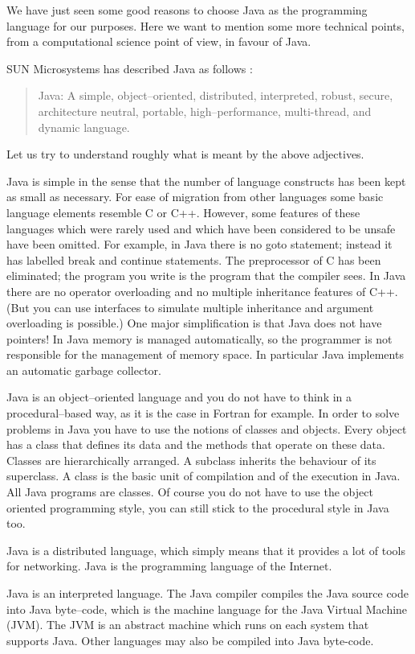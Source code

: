 We have just seen some good reasons to choose Java as the programming language
for our purposes. Here we want to mention some more technical points, from a 
computational science point of view, in favour of Java.

SUN Microsystems has described Java as follows \cite[]{javanutshell}:
\begin{quote}
Java: A simple, object--oriented, distributed, interpreted, robust, secure,
architecture neutral, portable, high--performance, multi-thread, and dynamic 
language.
\end{quote}
Let us try to understand roughly what is meant by the above adjectives.

Java is simple in the sense that the number of language constructs has been 
kept as small as necessary. For ease of migration from other languages some
basic language elements resemble C or C++. However, some features of these 
languages which were rarely used and which have been considered to be unsafe 
have been omitted. For example, in Java there is no goto statement; instead 
it has labelled break and continue statements. The preprocessor of C has been 
eliminated; the program you write is the program that the compiler sees. In 
Java there are no  operator overloading and no multiple inheritance 
features of C++. (But you can use interfaces to simulate multiple inheritance
and argument overloading is possible.)
One major simplification is that Java does not have pointers!
In Java memory is managed automatically, so the programmer is not responsible 
for the management  of memory space. In particular Java implements an 
automatic  garbage collector.

Java is an object--oriented language and you do not have to think in a 
procedural--based way, as it is the case in Fortran for example. In order to 
solve problems in Java you have to use the notions of classes and objects. 
Every object has a class that defines its data and the methods that operate 
on these data. Classes are hierarchically arranged. A subclass inherits the 
behaviour of its superclass. A class is the basic unit of compilation
and of the execution in Java. All Java programs are classes.
Of course you do not have to use the object oriented programming style,
you can still stick to the procedural style in Java too.

Java is a distributed language, which simply means that it provides a lot of 
tools for networking. Java is the programming language of the Internet.

Java is an interpreted language. The Java compiler compiles the Java
source code into Java byte--code, which is the machine language for the Java
Virtual Machine (JVM). The JVM is an abstract machine which runs on each system
that supports Java. Other languages may also be compiled into Java byte-code.

